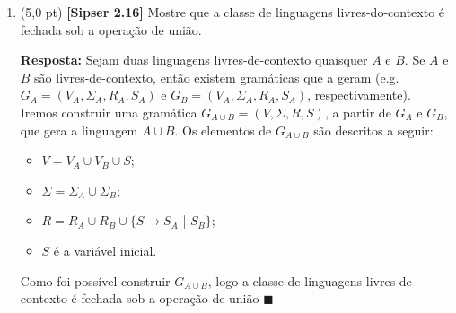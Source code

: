 \documentclass[12pt,a4paper,oneside]{article}
\begin{document}
\begin{enumerate}
	\newpage
	
	\item (5,0 pt) {\bf [Sipser 2.16]}  Mostre que a classe de linguagens livres-do-contexto é fechada sob a operação de união.
	
	\vspace*{0.3cm}
	
	{\color{blue} {\bf Resposta:} Sejam duas linguagens livres-de-contexto quaisquer $A$ e $B$. Se $A$ e $B$ são livres-de-contexto, então existem gramáticas que a geram (e.g. $G_A = (V_A, \Sigma_A, R_A, S_A)$ e $G_B = (V_A, \Sigma_A, R_A, S_A)$, respectivamente). Iremos construir uma gramática $G_{A\cup B} = (V, \Sigma, R, S)$, a partir de $G_A$ e $G_B$, que gera a linguagem $A \cup B$. Os elementos de $G_{A \cup B}$ são descritos a seguir:
		\begin{itemize}
			\item $V = V_A \cup V_B \cup S$;
			\item $\Sigma = \Sigma_A \cup \Sigma_B$;
			\item $R = R_A \cup R_B \cup \{S \rightarrow S_A$ | $S_B\}$;
			\item $S$ é a variável inicial.
		\end{itemize}
	Como foi possível construir $G_{A \cup B}$, logo a classe de linguagens livres-de-contexto é fechada sob a operação de união $\blacksquare$
	}

\end{enumerate}
\end{document}
